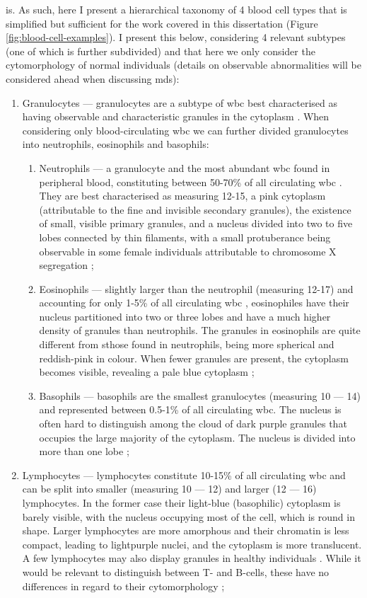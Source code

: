 is. As such, here I present a hierarchical taxonomy of 4 blood cell types that is simplified but sufficient for the work covered in this dissertation (Figure \ref{fig:blood-cell-examples}). I present this below, considering 4 relevant subtypes (one of which is further subdivided) and that here we only consider the cytomorphology of normal individuals (details on observable abnormalities will be considered ahead when discussing \ac{mds}):
\begin{enumerate}
    \item{Granulocytes} --- granulocytes are a subtype of \ac{wbc} best characterised as having observable and characteristic granules in the cytoplasm \cite{Web2009-xt}. When considering only blood-circulating \ac{wbc} we can further divided granulocytes into neutrophils, eosinophils and basophils:
    \begin{enumerate}
        \item{Neutrophils} --- a granulocyte and the most abundant \ac{wbc} found in peripheral blood, constituting between 50-70\% of all circulating \ac{wbc} \cite{Actor2012-wq}. They are best characterised as measuring 12-15\Mum, a pink cytoplasm (attributable to the fine and invisible secondary granules), the existence of small, visible primary granules, and a nucleus divided into two to five lobes connected by thin filaments, with a small protuberance being observable in some female individuals attributable to chromosome X segregation \cite{Bain2014-oc};
        \item{Eosinophils} --- slightly larger than the neutrophil (measuring 12-17\Mum) and accounting for only 1-5\% of all circulating \ac{wbc} \cite{Simon2007-un}, eosinophiles have their nucleus partitioned into two or three lobes and have a much higher density of granules than neutrophils. The granules in eosinophils are quite different from sthose found in neutrophils, being more spherical and reddish-pink in colour. When fewer granules are present, the cytoplasm becomes visible, revealing a pale blue cytoplasm \cite{Bain2014-oc};
        \item{Basophils} --- basophils are the smallest granulocytes (measuring 10 --- 14\Mum) and represented between 0.5-1\% of all circulating \ac{wbc}. The nucleus is often hard to distinguish among the cloud of dark purple granules that occupies the large majority of the cytoplasm. The nucleus is divided into more than one lobe \cite{Bain2014-oc};
    \end{enumerate}
    \item{Lymphocytes} --- lymphocytes constitute 10-15\% of all circulating \ac{wbc} and can be split into smaller (measuring 10 --- 12\Mum) and larger (12 --- 16\Mum) lymphocytes. In the former case their light-blue (basophilic) cytoplasm is barely visible, with the nucleus occupying most of the cell, which is round in shape. Larger lymphocytes are more amorphous and their chromatin is less compact, leading to lightpurple nuclei, and the cytoplasm is more translucent. A few lymphocytes may also display granules in healthy individuals \cite{Bain2014-oc}. While it would be relevant to distinguish between T- and B-cells, these have no differences in regard to their cytomorphology \cite{Cano2013-gu};

\end{enumerate}
